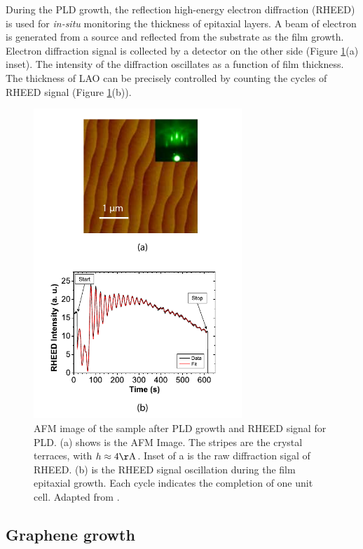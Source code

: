 \documentclass[pdflatex, sectionletters, 12pt]{pittetd}    %
\begin{document}
During the PLD growth, the reflection high-energy electron diffraction (RHEED) is used for \emph{in-situ} monitoring the thickness of epitaxial layers. A beam of electron is generated from a source and reflected from the substrate as the film growth. Electron diffraction signal is collected by a detector on the other side (Figure \ref{FIG:RHEED}(a) inset). The intensity of the diffraction oscillates as a function of film thickness. The thickness of LAO can be precisely controlled by counting the cycles of RHEED signal (Figure \ref{FIG:RHEED}(b)).

\begin{figure}[hp!]
	\centering
	\includegraphics[width=0.7\textwidth]{Drawing/PLD_RHEED.pdf}
	\caption{AFM image of the sample after PLD growth and RHEED signal for PLD. (a) shows is the AFM Image. The stripes are the crystal terraces, with $h \approx 4 \mathrm{\AA}$. Inset of a is the raw diffraction sigal of RHEED. (b) is the RHEED signal oscillation during the film epitaxial growth. Each cycle indicates the completion of one unit cell. Adapted from \cite{podkaminer2016real}.}
	\label{FIG:RHEED}
\end{figure}

\subsection{Graphene growth}
\end{document}
